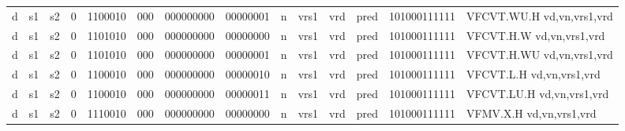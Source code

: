 \begin{landscape}
\begin{table}[p]
\begin{small}
\begin{center}
\begin{tabular}{p{0.08in}@{}p{0.08in}@{}p{0.08in}@{}p{0.08in}@{}p{0.50in}@{}p{0.30in}@{}p{0.08in}@{}p{0.8in}@{}p{0.48in}@{}p{0.32in}@{}p{0.08in}@{}p{0.8in}@{}p{0.8in}@{}p{0.4in}@{}p{0.56in}l}
\multicolumn{1}{|c|}{d} &
\multicolumn{1}{c|}{s1} &
\multicolumn{1}{c|}{s2} &
\multicolumn{1}{c|}{0} &
\multicolumn{1}{c|}{1100010} &
\multicolumn{1}{c|}{000} &
\multicolumn{2}{c|}{000000000} &
\multicolumn{2}{c|}{00000001} &
\multicolumn{1}{c|}{n} &
\multicolumn{1}{c|}{vrs1} &
\multicolumn{1}{c|}{vrd} &
\multicolumn{1}{c|}{pred} &
\multicolumn{1}{c|}{101000111111} & VFCVT.WU.H vd,vn,vrs1,vrd \\
\cline{1-15}
  

\multicolumn{1}{|c|}{d} &
\multicolumn{1}{c|}{s1} &
\multicolumn{1}{c|}{s2} &
\multicolumn{1}{c|}{0} &
\multicolumn{1}{c|}{1101010} &
\multicolumn{1}{c|}{000} &
\multicolumn{2}{c|}{000000000} &
\multicolumn{2}{c|}{00000000} &
\multicolumn{1}{c|}{n} &
\multicolumn{1}{c|}{vrs1} &
\multicolumn{1}{c|}{vrd} &
\multicolumn{1}{c|}{pred} &
\multicolumn{1}{c|}{101000111111} & VFCVT.H.W vd,vn,vrs1,vrd \\
\cline{1-15}
  

\multicolumn{1}{|c|}{d} &
\multicolumn{1}{c|}{s1} &
\multicolumn{1}{c|}{s2} &
\multicolumn{1}{c|}{0} &
\multicolumn{1}{c|}{1101010} &
\multicolumn{1}{c|}{000} &
\multicolumn{2}{c|}{000000000} &
\multicolumn{2}{c|}{00000001} &
\multicolumn{1}{c|}{n} &
\multicolumn{1}{c|}{vrs1} &
\multicolumn{1}{c|}{vrd} &
\multicolumn{1}{c|}{pred} &
\multicolumn{1}{c|}{101000111111} & VFCVT.H.WU vd,vn,vrs1,vrd \\
\cline{1-15}
  

\multicolumn{1}{|c|}{d} &
\multicolumn{1}{c|}{s1} &
\multicolumn{1}{c|}{s2} &
\multicolumn{1}{c|}{0} &
\multicolumn{1}{c|}{1100010} &
\multicolumn{1}{c|}{000} &
\multicolumn{2}{c|}{000000000} &
\multicolumn{2}{c|}{00000010} &
\multicolumn{1}{c|}{n} &
\multicolumn{1}{c|}{vrs1} &
\multicolumn{1}{c|}{vrd} &
\multicolumn{1}{c|}{pred} &
\multicolumn{1}{c|}{101000111111} & VFCVT.L.H vd,vn,vrs1,vrd \\
\cline{1-15}
  

\multicolumn{1}{|c|}{d} &
\multicolumn{1}{c|}{s1} &
\multicolumn{1}{c|}{s2} &
\multicolumn{1}{c|}{0} &
\multicolumn{1}{c|}{1100010} &
\multicolumn{1}{c|}{000} &
\multicolumn{2}{c|}{000000000} &
\multicolumn{2}{c|}{00000011} &
\multicolumn{1}{c|}{n} &
\multicolumn{1}{c|}{vrs1} &
\multicolumn{1}{c|}{vrd} &
\multicolumn{1}{c|}{pred} &
\multicolumn{1}{c|}{101000111111} & VFCVT.LU.H vd,vn,vrs1,vrd \\
\cline{1-15}
  

\multicolumn{1}{|c|}{d} &
\multicolumn{1}{c|}{s1} &
\multicolumn{1}{c|}{s2} &
\multicolumn{1}{c|}{0} &
\multicolumn{1}{c|}{1110010} &
\multicolumn{1}{c|}{000} &
\multicolumn{2}{c|}{000000000} &
\multicolumn{2}{c|}{00000000} &
\multicolumn{1}{c|}{n} &
\multicolumn{1}{c|}{vrs1} &
\multicolumn{1}{c|}{vrd} &
\multicolumn{1}{c|}{pred} &
\multicolumn{1}{c|}{101000111111} & VFMV.X.H vd,vn,vrs1,vrd \\
\cline{1-15}
  


\end{tabular}
\end{center}
\end{small}
\end{table}
\end{landscape}
